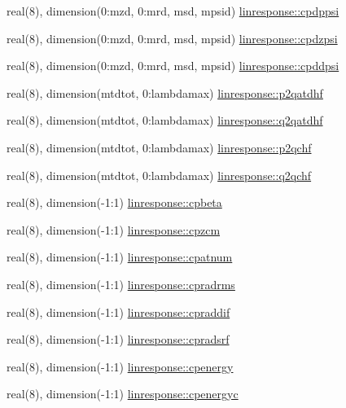 \begin{DoxyCompactItemize}
\item 
real(8), dimension(0\+:mzd, 0\+:mrd, msd, mpsid) \hyperlink{namespacelinresponse_a30e151e0b022c082f5babbbf5f3500c9}{linresponse\+::cpdppsi}
\item 
real(8), dimension(0\+:mzd, 0\+:mrd, msd, mpsid) \hyperlink{namespacelinresponse_a42a510f315dcfe63c844b515de247957}{linresponse\+::cpdzpsi}
\item 
real(8), dimension(0\+:mzd, 0\+:mrd, msd, mpsid) \hyperlink{namespacelinresponse_aca372ddfa36e61e983a177ef5aac3207}{linresponse\+::cpddpsi}
\item 
real(8), dimension(mtdtot, 0\+:lambdamax) \hyperlink{namespacelinresponse_ad9211706fb38ee5ddf8f1330b320611e}{linresponse\+::p2qatdhf}
\item 
real(8), dimension(mtdtot, 0\+:lambdamax) \hyperlink{namespacelinresponse_a5661ced2c24fb8ad7f99ef6949fb8fe0}{linresponse\+::q2qatdhf}
\item 
real(8), dimension(mtdtot, 0\+:lambdamax) \hyperlink{namespacelinresponse_a43b732836eeb8fd0701a1d4d1c84bcf1}{linresponse\+::p2qchf}
\item 
real(8), dimension(mtdtot, 0\+:lambdamax) \hyperlink{namespacelinresponse_ae848883da04b775a0c09b1b8b63ac0b2}{linresponse\+::q2qchf}
\item 
real(8), dimension(-\/1\+:1) \hyperlink{namespacelinresponse_ab0af48119842ca22b14c5bd0fc696009}{linresponse\+::cpbeta}
\item 
real(8), dimension(-\/1\+:1) \hyperlink{namespacelinresponse_a1ac93ef7fd704c651120d666cf06c16d}{linresponse\+::cpzcm}
\item 
real(8), dimension(-\/1\+:1) \hyperlink{namespacelinresponse_a8f352b36f61a65b218a2e68b846e45c0}{linresponse\+::cpatnum}
\item 
real(8), dimension(-\/1\+:1) \hyperlink{namespacelinresponse_a23b5f09aecbf28425e742b0306bda253}{linresponse\+::cpradrms}
\item 
real(8), dimension(-\/1\+:1) \hyperlink{namespacelinresponse_a8d17637a2fa968976fd5d33dd58ca008}{linresponse\+::cpraddif}
\item 
real(8), dimension(-\/1\+:1) \hyperlink{namespacelinresponse_afd1f3a534c58c755902559f0379b7dcd}{linresponse\+::cpradsrf}
\item 
real(8), dimension(-\/1\+:1) \hyperlink{namespacelinresponse_aedf1f63c865a5ca60d62e01490ff724d}{linresponse\+::cpenergy}
\item 
real(8), dimension(-\/1\+:1) \hyperlink{namespacelinresponse_a077f9f139d2e09d605c8abca5faf60f1}{linresponse\+::cpenergyc}

\end{DoxyCompactItemize}
